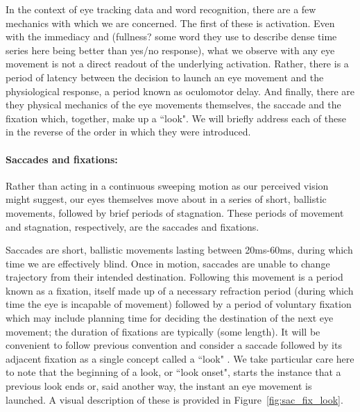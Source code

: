 \documentclass{article}
\begin{document}
In the context of eye tracking data and word recognition, there are a few mechanics with which we are concerned. The first of these is activation. Even with the immediacy and (fullness? some word they use to describe dense time series here being better than yes/no response), what we observe with any eye movement is not a direct readout of the underlying activation.  Rather, there is a period of latency between the decision to launch an eye movement and the physiological response, a period known as oculomotor delay. And finally, there are they physical mechanics of the eye movements themselves, the saccade and the fixation which, together, make up a ``look". We will briefly address each of these in the reverse of the order in which they were introduced.



\paragraph{Saccades and fixations:} Rather than acting in a continuous sweeping motion as our perceived vision might suggest, our eyes themselves move about in a series of short, ballistic movements, followed by brief periods of stagnation. These periods of movement and stagnation, respectively, are the saccades and fixations. 

Saccades are short, ballistic movements lasting between 20ms-60ms, during which time we are effectively blind. Once in motion, saccades are unable to change trajectory from their intended destination. Following this movement is a period known as a fixation, itself made up of a necessary refraction period (during which time the eye is incapable of movement) followed by a period of voluntary fixation which may include planning time for deciding the destination of the next eye movement; the duration of fixations are typically (some length). It will be convenient to follow previous convention and consider a saccade followed by its adjacent fixation as a single concept called a ``look" \cite{mcmurray2002look}. We take particular care here to note that the beginning of a look, or ``look onset", starts the instance that a previous look ends or, said another way, the instant an eye movement is launched. A visual description of these is provided in Figure~\ref{fig:sac_fix_look}.
\end{document}
